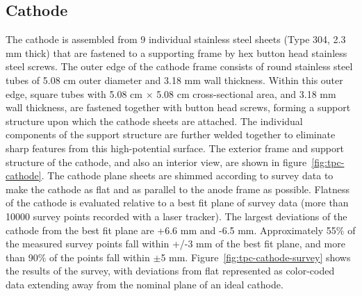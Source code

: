 \subsection{Cathode}
The cathode is assembled from 9 individual stainless steel sheets (Type 304, 2.3 mm thick) that are fastened to a supporting frame by hex button head stainless steel screws. The outer edge of the cathode frame consists of round stainless steel tubes of 5.08 cm outer diameter and 3.18 mm wall thickness.  Within this outer edge, square tubes with 5.08 cm $\times$ 5.08 cm cross-sectional area, and 3.18 mm wall thickness, are fastened together with button head screws, forming a support structure upon which the cathode sheets are attached.  The individual components of the support structure are further welded together to eliminate sharp features from this high-potential surface.  The exterior frame and support structure of the cathode, and also an interior view, are shown in figure~\ref{fig:tpc-cathode}. The cathode plane sheets are shimmed according to survey data to make the cathode as flat and as parallel to the anode frame as possible. Flatness of the cathode is evaluated relative to a best fit plane of survey data (more than 10000 survey points recorded with a laser tracker). The largest deviations of the cathode from the best fit plane are +6.6 mm and -6.5 mm. Approximately 55$\%$ of the measured survey points fall within +/-3 mm of the best fit plane, and more than 90$\%$ of the points fall within $\pm$5 mm.  Figure~\ref{fig:tpc-cathode-survey} shows the results of the survey, with deviations from flat represented as color-coded data extending away from the nominal plane of an ideal cathode. %


